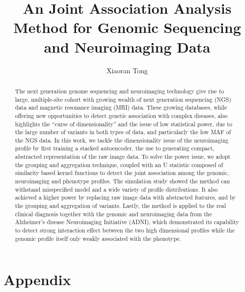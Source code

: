 \documentclass[12pt]{article}
\author{Xiaoran Tong}
\begin{document}
\title{An Joint Association Analysis Method for Genomic Sequencing and Neuroimaging Data}
\maketitle

\begin{abstract}
The next generation genome sequencing and neuroimaging technology give rise to large, multiple-site cohort with growing wealth of next generation sequencing (NGS) data and magnetic resonance imaging (MRI) data. These growing databases, while offering new opportunities to detect genetic association with complex diseases, also highlights the ``curse of dimensionality'' and the issue of low statistical power, due to the large number of variants in both types of data, and particularly the low MAF of the NGS data. In this work, we tackle the dimensionality issue of the neuroimaging profile by first training a stacked autoencoder, the use to generating compact, abstracted representation of the raw image data. To solve the power issue, we adopt the grouping and aggregation technique, coupled with an U statistic composed of similarity based kernel functions to detect the joint association among the genomic, neuroimaging and phenotype profiles. The simulation study showed the method can withstand misspecified model and a wide variety of profile distributions. It also achieved a higher power by replacing raw image data with abstracted features, and by the grouping and aggregation of variants. Lastly, the method is applied to the real clinical diagnosis together with the genomic and neuroimaging data from the Alzheimer's disease Neuroimaging Initiative (ADNI), which demonstrated its capability to detect strong interaction effect between the two high dimensional profiles while the genomic profile itself only weakly associated with the phenotype.
\end{abstract}






\printbibliography

\section{Appendix}


\end{document}
